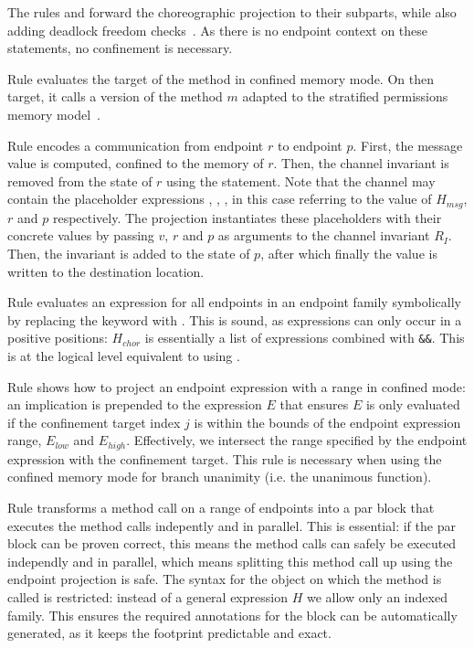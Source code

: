 The rules  and  forward the choreographic projection to their subparts, while also adding deadlock freedom checks~\cite{VandenBos2023}. As there is no endpoint context on these statements, no confinement is necessary.

Rule  evaluates the target of the method in confined memory mode. On then target, it calls a version of the method $m$ adapted to the stratified permissions memory model~\cite{Rubbens2024}.

Rule  encodes a communication from endpoint $r$ to endpoint $p$. First, the message value is computed, confined to the memory of $r$. Then, the channel invariant is removed from the state of $r$ using the \kwexhale{} statement. Note that the channel may contain the placeholder expressions \kwmsg, \kwsender, \kwreceiver, in this case referring to the value of $H_{msg}$, $r$ and $p$ respectively. The projection instantiates these placeholders with their concrete values by passing $v$, $r$ and $p$ as arguments to the channel invariant $R_I$. Then, the invariant is added to the state of $p$, after which finally the value is written to the destination location.

Rule  evaluates an expression for all endpoints in an endpoint family symbolically by replacing the \kwepexpr{} keyword with \kwforall{}. This is sound, as \kwepexpr{} expressions can only occur in a positive positions: $H_{chor}$ is essentially a list of \kwepexpr{} expressions combined with \texttt{\&\&}. This is at the logical level equivalent to using \kwforall{}.

Rule  shows how to project an endpoint expression with a range in confined mode: an implication is prepended to the expression $E$ that ensures $E$ is only evaluated if the confinement target index $j$ is within the bounds of the endpoint expression range, $E_{low}$ and $E_{high}$. Effectively, we intersect the range specified by the endpoint expression with the confinement target. This rule is necessary when using the confined memory mode for branch unanimity (i.e. the \textsf{unanimous} function).

Rule  transforms a method call on a range of endpoints into a par block that executes the method calls indepently and in parallel. This is essential: if the par block can be proven correct, this means the method calls can safely be executed independly and in parallel, which means splitting this method call up using the endpoint projection is safe. The syntax for the object on which the method is called is restricted: instead of a general expression $H$ we allow only an indexed family. This ensures the required annotations for the \kwpar{} block can be automatically generated, as it keeps the footprint predictable and exact.

